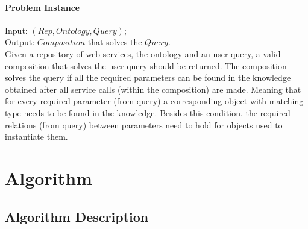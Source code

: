 \documentclass[12pt]{article}
\theoremstyle{definition}
\begin{document}
	
	\paragraph{Problem Instance}
	Input: $(Rep, Ontology, Query)$;\\
	Output: $Composition$ that solves the $Query$. \\ %
	Given a repository of web services, the ontology and an user query, a valid composition that solves the user query should be returned. The composition solves the query if all the required parameters can be found in the knowledge obtained after all service calls (within the composition) are made. Meaning that for every required parameter (from query) a corresponding object with matching type needs to be found in the knowledge. Besides this condition, the required relations (from query) between parameters need to hold for objects used to instantiate them.
	\par
	
\newpage
\section{Algorithm} \label{algorithm}
	\subsection{Algorithm Description}
\end{document}
